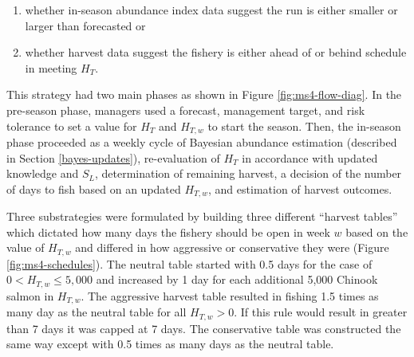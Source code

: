 \documentclass[12pt,]{book}
\theoremstyle{definition}
\theoremstyle{definition}
\theoremstyle{definition}
\theoremstyle{remark}
\begin{document}
\begin{enumerate}
\def\labelenumi{(\arabic{enumi})}
\item
  whether in-season abundance index data suggest the run is either
  smaller or larger than forecasted or
\item
  whether harvest data suggest the fishery is either ahead of or behind
  schedule in meeting \(H_T\).
\end{enumerate}

\noindent
This strategy had two main phases as shown in Figure
\ref{fig:ms4-flow-diag}. In the pre-season phase, managers used a
forecast, management target, and risk tolerance to set a value for
\(H_T\) and \(H_{T,w}\) to start the season. Then, the in-season phase
proceeded as a weekly cycle of Bayesian abundance estimation (described
in Section \ref{bayes-updates}), re-evaluation of \(H_T\) in accordance
with updated knowledge and \(S_L\), determination of remaining harvest,
a decision of the number of days to fish based on an updated
\(H_{T,w}\), and estimation of harvest outcomes.

Three substrategies were formulated by building three different
``harvest tables'' which dictated how many days the fishery should be
open in week \(w\) based on the value of \(H_{T,w}\) and differed in how
aggressive or conservative they were (Figure \ref{fig:ms4-schedules}).
The neutral table started with 0.5 days for the case of
\(0 < H_{T,w} \le 5,000\) and increased by 1 day for each additional
5,000 Chinook salmon in \(H_{T,w}\). The aggressive harvest table
resulted in fishing 1.5 times as many day as the neutral table for all
\(H_{T,w} > 0\). If this rule would result in greater than 7 days it was
capped at 7 days. The conservative table was constructed the same way
except with 0.5 times as many days as the neutral table.
\end{document}
